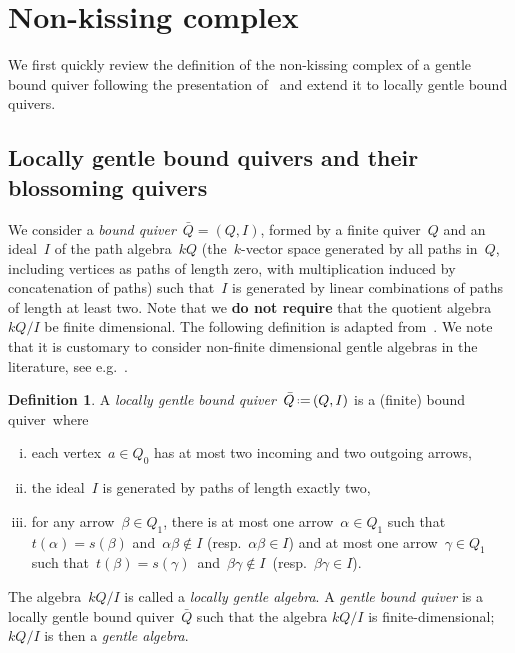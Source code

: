 \documentclass{amsart}
\theoremstyle{definition}
\newtheorem{definition}[theorem]{Definition}
\newcommand{\eqdef}{\mbox{\,\raisebox{0.2ex}{\scriptsize\ensuremath{\mathrm:}}\ensuremath{=}\,}} %
\newcommand{\darkblue}{\color{darkblue}} %
\newcommand{\defn}[1]{\textsl{\darkblue #1}} %
\begin{document}
\section{Non-kissing complex}\label{sec:nonKissingComplex}

We first quickly review the definition of the non-kissing complex of a gentle bound quiver following the presentation of~\cite{PaluPilaudPlamondon} and extend it to locally gentle bound quivers.

\subsection{Locally gentle bound quivers and their blossoming quivers}

We consider a \defn{bound quiver}~$\bar Q = (Q,I)$, formed by a finite quiver~$Q$ and an ideal~$I$ of the path algebra~$kQ$ (the~$k$-vector space generated by all paths in~$Q$, including vertices as paths of length zero, with multiplication induced by concatenation of paths) such that~$I$ is generated by linear combinations of paths of length at least two.
Note that we \textbf{do not require} that the quotient algebra~$kQ/I$ be finite dimensional.
The following definition is adapted from~\cite{ButlerRingel}. We note that it is customary to consider non-finite dimensional gentle algebras in the literature, see e.g.~\cite{Schroer}.

\begin{definition}
\label{def:gentleQuiver}
A \defn{locally gentle bound quiver}~$\bar Q \eqdef (Q,I)$ is a (finite) bound quiver~where
\begin{enumerate}[(i)]
\item each vertex~$a \in Q_0$ has at most two incoming and two outgoing arrows,
\item the ideal~$I$ is generated by paths of length exactly two,
\item for any arrow~$\beta \in Q_1$, there is at most one arrow~$\alpha \in Q_1$ such that~$t(\alpha) = s(\beta)$ and~${\alpha\beta\notin I}$ (resp.~$\alpha\beta \in I$) and at most one arrow~$\gamma \in Q_1$ such that~$t(\beta) = s(\gamma)$~and~${\beta\gamma\notin I}$~(resp.~${\beta\gamma \in I}$).
\end{enumerate}
The algebra~$kQ/I$ is called a \defn{locally gentle algebra}.
A \defn{gentle bound quiver} is a locally gentle bound quiver~$\bar Q$ such that the algebra $kQ/I$ is finite-dimensional; $kQ/I$ is then a \defn{gentle algebra}.
\end{definition}
\end{document}
